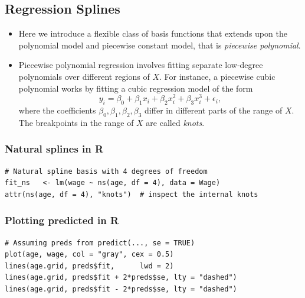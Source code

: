 \documentclass{article}
\begin{document}
\subsection{Regression Splines}
\begin{itemize}
  \item Here we introduce a flexible class of basis functions that extends upon the polynomial model and piecewise constant model, that is \emph{piecewise polynomial}.
  \item Piecewise polynomial regression involves fitting separate low‐degree polynomials over different regions of $X$. For instance, a piecewise cubic polynomial works by fitting a cubic regression model of the form
    \begin{equation*}
      y_i = \beta_0 + \beta_1 x_i + \beta_2 x_i^2 + \beta_3 x_i^3 + \epsilon_i,
    \end{equation*}
    where the coefficients $\beta_0,\beta_1,\beta_2,\beta_3$ differ in different parts of the range of $X$. The breakpoints in the range of $X$ are called \emph{knots}.
\end{itemize}

\subsubsection{Natural splines in R}
\begin{lstlisting}
# Natural spline basis with 4 degrees of freedom
fit_ns   <- lm(wage ~ ns(age, df = 4), data = Wage)
attr(ns(age, df = 4), "knots")  # inspect the internal knots
\end{lstlisting}

\subsubsection{Plotting predicted in R}
\begin{lstlisting}
# Assuming preds from predict(..., se = TRUE)
plot(age, wage, col = "gray", cex = 0.5)
lines(age.grid, preds$fit,      lwd = 2)
lines(age.grid, preds$fit + 2*preds$se, lty = "dashed")
lines(age.grid, preds$fit - 2*preds$se, lty = "dashed")
\end{lstlisting}
\end{document}
